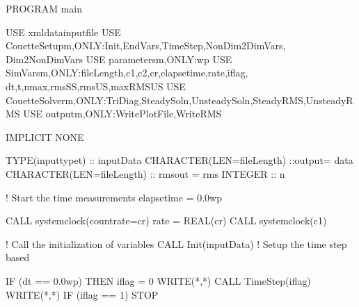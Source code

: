\documentclass[letterpaper,10pt,english]{sphinxmanual}
\begin{document}
\begin{sphinxVerbatim}[commandchars=\\\{\}]
PROGRAM main

      USE xml\PYGZus{}data\PYGZus{}input\PYGZus{}file
      USE CouetteSetup\PYGZus{}m,ONLY:Init,EndVars,TimeStep,NonDim2DimVars,\PYGZam{}
                              Dim2NonDimVars
      USE parameters\PYGZus{}m,ONLY:wp
      USE SimVars\PYGZus{}m,ONLY:fileLength,c1,c2,cr,elapse\PYGZus{}time,rate,iflag,\PYGZam{}
                          dt,t,nmax,rms\PYGZus{}SS,rms\PYGZus{}US,maxRMS\PYGZus{}US
      USE CouetteSolver\PYGZus{}m,ONLY:TriDiag,SteadySoln,UnsteadySoln,SteadyRMS,UnsteadyRMS
      USE output\PYGZus{}m,ONLY:WritePlotFile,WriteRMS

      IMPLICIT NONE

      TYPE(input\PYGZus{}type\PYGZus{}t) :: inputData
      CHARACTER(LEN=fileLength) ::output= \PYGZsq{}data\PYGZsq{}
      CHARACTER(LEN=fileLength) :: rmsout = \PYGZsq{}rms\PYGZsq{}
      INTEGER :: n

      ! Start the time measurements
      elapse\PYGZus{}time = 0.0\PYGZus{}wp

      CALL system\PYGZus{}clock(count\PYGZus{}rate=cr)
      rate = REAL(cr)
      CALL system\PYGZus{}clock(c1)

      ! Call the initialization of variables
      CALL Init(inputData)
      ! Setup the time step based

      IF (dt == 0.0\PYGZus{}wp) THEN
              iflag = 0
              WRITE(*,*)\PYGZsq{}\PYGZhy{}\PYGZhy{}\PYGZhy{}\PYGZhy{}\PYGZhy{}\PYGZhy{}\PYGZhy{}\PYGZhy{}\PYGZhy{}\PYGZhy{}\PYGZhy{}\PYGZhy{}\PYGZhy{}\PYGZhy{}\PYGZhy{}\PYGZhy{}\PYGZhy{}\PYGZhy{}\PYGZhy{}\PYGZhy{}\PYGZhy{}\PYGZhy{}\PYGZhy{}\PYGZhy{}\PYGZhy{}\PYGZhy{}\PYGZhy{}\PYGZhy{}\PYGZhy{}\PYGZhy{}\PYGZhy{}\PYGZhy{}\PYGZhy{}\PYGZhy{}\PYGZhy{}\PYGZhy{}\PYGZhy{}\PYGZhy{}\PYGZhy{}\PYGZhy{}\PYGZhy{}\PYGZhy{}\PYGZhy{}\PYGZhy{}\PYGZhy{}\PYGZhy{}\PYGZhy{}\PYGZhy{}\PYGZhy{}\PYGZhy{}\PYGZhy{}\PYGZhy{}\PYGZhy{}\PYGZhy{}\PYGZhy{}\PYGZhy{}\PYGZhy{}\PYGZsq{}
              CALL TimeStep(iflag)
              WRITE(*,*)\PYGZsq{}\PYGZhy{}\PYGZhy{}\PYGZhy{}\PYGZhy{}\PYGZhy{}\PYGZhy{}\PYGZhy{}\PYGZhy{}\PYGZhy{}\PYGZhy{}\PYGZhy{}\PYGZhy{}\PYGZhy{}\PYGZhy{}\PYGZhy{}\PYGZhy{}\PYGZhy{}\PYGZhy{}\PYGZhy{}\PYGZhy{}\PYGZhy{}\PYGZhy{}\PYGZhy{}\PYGZhy{}\PYGZhy{}\PYGZhy{}\PYGZhy{}\PYGZhy{}\PYGZhy{}\PYGZhy{}\PYGZhy{}\PYGZhy{}\PYGZhy{}\PYGZhy{}\PYGZhy{}\PYGZhy{}\PYGZhy{}\PYGZhy{}\PYGZhy{}\PYGZhy{}\PYGZhy{}\PYGZhy{}\PYGZhy{}\PYGZhy{}\PYGZhy{}\PYGZhy{}\PYGZhy{}\PYGZhy{}\PYGZhy{}\PYGZhy{}\PYGZhy{}\PYGZhy{}\PYGZhy{}\PYGZhy{}\PYGZhy{}\PYGZhy{}\PYGZhy{}\PYGZsq{}
              IF (iflag == 1) STOP


\end{sphinxVerbatim}
\end{document}

